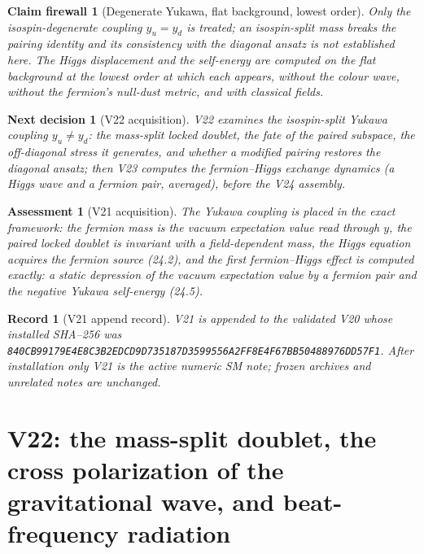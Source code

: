 \documentclass[11pt]{article}
\newtheorem{firewall}[theorem]{Claim firewall}
\newtheorem{decision}[theorem]{Next decision}
\newtheorem{assessment}[theorem]{Assessment}
\newtheorem{record}[theorem]{Record}
\theoremstyle{remark}
\begin{document}
\begin{firewall}[Degenerate Yukawa, flat background, lowest order]
\label{fire:v20v21}
Only the isospin-degenerate coupling \(y_u=y_d\) is treated; an
isospin-split mass breaks the pairing identity and its consistency with
the diagonal ansatz is not established here.  The Higgs displacement
and the self-energy are computed on the flat background at the lowest
order at which each appears, without the colour wave, without the
fermion's null-dust metric, and with classical fields.
\end{firewall}

\begin{decision}[V22 acquisition]
\label{dec:v20v21-next}
V22 examines the isospin-split Yukawa coupling \(y_u\neq y_d\): the
mass-split locked doublet, the fate of the paired subspace, the
off-diagonal stress it generates, and whether a modified pairing
restores the diagonal ansatz; then V23 computes the fermion--Higgs
exchange dynamics (a Higgs wave and a fermion pair, averaged), before
the V24 assembly.
\end{decision}

\begin{assessment}[V21 acquisition]
\label{ass:v20v21}
The Yukawa coupling is placed in the exact framework: the fermion
mass is the vacuum expectation value read through \(y\), the paired
locked doublet is invariant with a field-dependent mass, the Higgs
equation acquires the fermion source (24.2), and the first
fermion--Higgs effect is computed exactly: a static depression of the
vacuum expectation value by a fermion pair and the negative Yukawa
self-energy (24.5).
\end{assessment}

\begin{record}[V21 append record]
\label{rec:v20v21}
V21 is appended to the validated V20 whose installed SHA--256 was
\texttt{840CB99179E4E8C3B2EDCD9D735187D3599556A2FF8E4F67BB50488976DD57F1}.
After installation only V21 is the active numeric SM note; frozen
archives and unrelated notes are unchanged.
\end{record}


\section{V22: the mass-split doublet, the cross polarization of the gravitational wave, and beat-frequency radiation}
\label{sec:v20v22}
\end{document}
